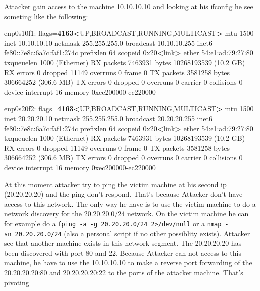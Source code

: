 \documentclass{assets/ipesethesis}
\newenvironment{Shaded}{\begin{snugshade}}{\end{snugshade}}
\newcommand{\ExtensionTok}[1]{#1}
\newcommand{\NormalTok}[1]{#1}
\newcommand{\OperatorTok}[1]{\textcolor[rgb]{0.81,0.36,0.00}{\textbf{#1}}}
\begin{document}
Attacker gain access to the machine 10.10.10.10 and looking at his ifconfig he see someting like the following:

\begin{Shaded}
\begin{Highlighting}[]
\ExtensionTok{enp0s10f1}\NormalTok{: flags=}\OperatorTok{4163<}\NormalTok{UP,BROADCAST,RUNNING,MULTICAST}\OperatorTok{>}\NormalTok{  mtu 1500}
        \ExtensionTok{inet}\NormalTok{ 10.10.10.10  netmask 255.255.255.0  broadcast 10.10.10.255}
        \ExtensionTok{inet6}\NormalTok{ fe80::7e8c:6a7c:faf1:274c  prefixlen 64  scopeid 0x20}\OperatorTok{<}\NormalTok{link}\OperatorTok{>}
        \ExtensionTok{ether}\NormalTok{ 54:e1:ad:79:27:80  txqueuelen 1000  (Ethernet)}
        \ExtensionTok{RX}\NormalTok{ packets 7463931  bytes 10268193539 (10.2 GB)}
        \ExtensionTok{RX}\NormalTok{ errors 0  dropped 11149  overruns 0  frame 0}
        \ExtensionTok{TX}\NormalTok{ packets 3581258  bytes 306664252 (306.6 MB)}
        \ExtensionTok{TX}\NormalTok{ errors 0  dropped 0 overruns 0  carrier 0  collisions 0}
        \ExtensionTok{device}\NormalTok{ interrupt 16  memory 0xec200000-ec220000  }

\ExtensionTok{enp0s20f2}\NormalTok{: flags=}\OperatorTok{4163<}\NormalTok{UP,BROADCAST,RUNNING,MULTICAST}\OperatorTok{>}\NormalTok{  mtu 1500}
        \ExtensionTok{inet}\NormalTok{ 20.20.20.10  netmask 255.255.255.0  broadcast 20.20.20.255}
        \ExtensionTok{inet6}\NormalTok{ fe80::7e8c:6a7c:faf1:274c  prefixlen 64  scopeid 0x20}\OperatorTok{<}\NormalTok{link}\OperatorTok{>}
        \ExtensionTok{ether}\NormalTok{ 54:e1:ad:79:27:80  txqueuelen 1000  (Ethernet)}
        \ExtensionTok{RX}\NormalTok{ packets 7463931  bytes 10268193539 (10.2 GB)}
        \ExtensionTok{RX}\NormalTok{ errors 0  dropped 11149  overruns 0  frame 0}
        \ExtensionTok{TX}\NormalTok{ packets 3581258  bytes 306664252 (306.6 MB)}
        \ExtensionTok{TX}\NormalTok{ errors 0  dropped 0 overruns 0  carrier 0  collisions 0}
        \ExtensionTok{device}\NormalTok{ interrupt 16  memory 0xec200000-ec220000  }
\end{Highlighting}
\end{Shaded}

At this moment attacker try to ping the victim machine at his second ip (20.20.20.20) and the ping don't respond. That's because Attacker don't have access to this network.
The only way he have is to use the victim machine to do a network discovery for the 20.20.20.0/24 network. On the victim machine he can for example do a
\texttt{fping\ -a\ -g\ 20.20.20.0/24\ 2\textgreater{}/dev/null} or a \texttt{nmap\ -sn\ 20.20.20.0/24} (also a personal script if no other possiblity exists).
Attacker see that another machine exists in this network segment. The 20.20.20.20 has been discovered with port 80 and 22. Because Attacker can not access to this machine,
he have to use the 10.10.10.10 to make a reverse port forwarding of the 20.20.20.20:80 and 20.20.20.20:22 to the ports of the attacker machine. That's pivoting
\end{document}
